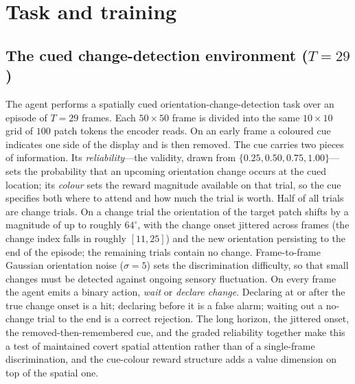 \section{Task and training}
\label{sec:task}

\subsection{The cued change-detection environment ($T=29$)}
The agent performs a spatially cued orientation-change-detection task over an episode of $T=29$ frames. Each $50\times50$ frame is divided into the same $10\times10$ grid of $100$ patch tokens the encoder reads. On an early frame a coloured cue indicates one side of the display and is then removed. The cue carries two pieces of information. Its \emph{reliability}---the validity, drawn from $\{0.25,0.50,0.75,1.00\}$---sets the probability that an upcoming orientation change occurs at the cued location; its \emph{colour} sets the reward magnitude available on that trial, so the cue specifies both where to attend and how much the trial is worth. Half of all trials are change trials. On a change trial the orientation of the target patch shifts by a magnitude of up to roughly $64^{\circ}$, with the change onset jittered across frames (the change index falls in roughly $[11,25]$) and the new orientation persisting to the end of the episode; the remaining trials contain no change. Frame-to-frame Gaussian orientation noise ($\sigma=5$) sets the discrimination difficulty, so that small changes must be detected against ongoing sensory fluctuation. On every frame the agent emits a binary action, \emph{wait} or \emph{declare change}. Declaring at or after the true change onset is a hit; declaring before it is a false alarm; waiting out a no-change trial to the end is a correct rejection. The long horizon, the jittered onset, the removed-then-remembered cue, and the graded reliability together make this a test of maintained covert spatial attention rather than of a single-frame discrimination, and the cue-colour reward structure adds a value dimension on top of the spatial one.

